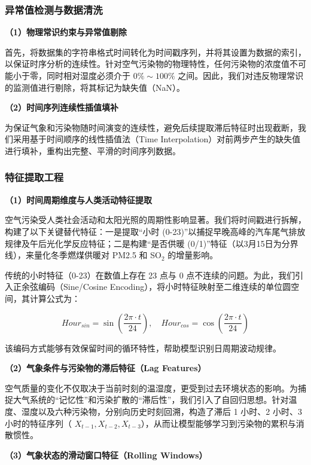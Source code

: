 \documentclass[a4paper, 12pt]{ctexart} %
\begin{document}
\subsubsection{异常值检测与数据清洗}

\textbf{（1）物理常识约束与异常值剔除}

首先，将数据集的字符串格式时间转化为时间戳序列，并将其设置为数据的索引，以保证时序分析的连续性。针对空气污染物的物理特性，任何污染物的浓度值不可能小于零，同时相对湿度必须介于 $0\% \sim 100\%$ 之间。因此，我们对违反物理常识的监测值进行剔除，将其标记为缺失值（NaN）。

\textbf{（2）时间序列连续性插值填补}

为保证气象和污染物随时间演变的连续性，避免后续提取滞后特征时出现截断，我们采用基于时间顺序的线性插值法（Time Interpolation）对前两步产生的缺失值进行填补，重构出完整、平滑的时间序列数据。
\bigskip
\subsubsection{特征提取工程}


\textbf{（1）时间周期维度与人类活动特征提取}\cite{fan2012}

空气污染受人类社会活动和太阳光照的周期性影响显著。我们将时间戳进行拆解，构建了以下关键替代特征：一是提取“小时 (0-23)”以捕捉早晚高峰的汽车尾气排放规律及午后光化学反应特征；二是构建“是否供暖 (0/1)”特征（以3月15日为分界线），来量化冬季燃煤供暖对 PM2.5 和 SO$_2$ 的增量影响。

传统的小时特征（0-23）在数值上存在 23 点与 0 点不连续的问题。为此，我们引入正余弦编码（Sine/Cosine Encoding），将小时特征映射至二维连续的单位圆空间，其计算公式为：

\begin{equation}
    Hour_{sin} = \sin\left(\frac{2\pi \cdot t}{24}\right), \quad Hour_{cos} = \cos\left(\frac{2\pi \cdot t}{24}\right)
\end{equation}

该编码方式能够有效保留时间的循环特性，帮助模型识别日周期波动规律。

\textbf{（2）气象条件与污染物的滞后特征（Lag Features）}

空气质量的变化不仅取决于当前时刻的温湿度，更受到过去环境状态的影响。为捕捉大气系统的“记忆性”和污染扩散的“滞后性”，我们引入了自回归思想。针对温度、湿度以及六种污染物，分别向历史时刻回溯，构造了滞后 1 小时、2 小时、3 小时的特征序列（ $X_{t-1}, X_{t-2}, X_{t-3}$），从而让模型能够学习到污染物的累积与消散惯性。

\textbf{（3）气象状态的滑动窗口特征（Rolling Windows）}
\end{document}
